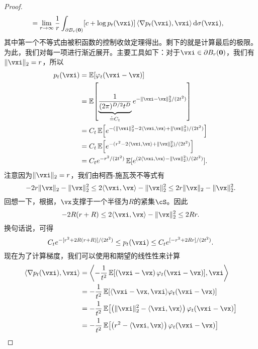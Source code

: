 \documentclass[../../book-main_zh.tex]{subfiles}
\begin{document}
\begin{proof}
\begin{align}
        &= \lim_{r \to \infty}\frac{1}{r}\int_{\partial B_{r}(\vzero)}[c + \log p_{t}(\vxi)]\ip*{\nabla p_{t}(\vxi)}{\vxi}\odif{\sigma(\vxi)},
    \end{align}
    其中第一个不等式由被积函数的控制收敛定理得出。剩下的就是计算最后的极限。为此，我们对每一项进行渐近展开。主要工具如下：对于\(\vxi \in \partial B_{r}(\vzero)\)，我们有\(\norm{\vxi}_{2} = r\)，所以
    \begin{align}
        p_{t}(\vxi)
        &= \Ex[\phi_{t}(\vxi - \vx)] \\ 
        &= \Ex\rs{\underbrace{\frac{1}{(2\pi)^{D/2}t^{D}}}_{\doteq C_{t}}e^{-\|\vxi - \vx\|_{2}^{2}/(2t^{2})}} \\
        &= C_{t}\Ex\rs{e^{-(\norm{\vxi}_{2}^{2} - 2\ip{\vxi}{\vx} + \norm{\vx}_{2}^{2})/(2t^{2})}} \\ 
        &= C_{t}\Ex\rs{e^{-(r^{2} - 2\ip{\vxi}{\vx} + \norm{\vx}_{2}^{2})/(2t^{2})}} \\ 
        &= C_{t}e^{-r^{2}/(2t^{2})}\Ex[e^{(2\ip{\vxi}{\vx} - \norm{\vx}_{2}^{2})/(2t^{2})}]. 
    \end{align}
    注意因为\(\norm{\vxi}_{2} = r\)，我们由柯西-施瓦茨不等式有
    \begin{equation}
        -2r\norm{\vx}_{2} - \norm{\vx}_{2}^{2} \leq 2\ip{\vxi}{\vx} - \norm{\vx}_{2}^{2} \leq 2r\norm{\vx}_{2} - \norm{\vx}_{2}^{2}.
    \end{equation}
    回想一下，根据，\(\vx\)支撑于一个半径为\(R\)的紧集\(\cS\)。因此
    \begin{equation}
        -2R(r + R) \leq 2\ip{\vxi}{\vx} - \norm{\vx}_{2}^{2} \leq 2Rr.
    \end{equation}
    换句话说，可得
    \begin{equation}
        C_{t}e^{-[r^{2} + 2R(r + R)]/(2t^{2})} \leq p_{t}(\vxi) \leq C_{t}e^{[-r^{2} + 2Rr]/(2t^{2})}.
    \end{equation}
    现在为了计算梯度，我们可以使用和期望的线性性来计算
    \begin{align}
        \ip{\nabla p_{t}(\vxi)}{\vxi}
        &= \ip*{-\frac{1}{t^{2}}\Ex\rs{\bp{\vxi - \vx}\phi_{t}(\vxi - \vx)}}{\vxi} \\
        &= -\frac{1}{t^{2}}\Ex\rs{\ip{\vxi - \vx}{\vxi}\phi_{t}(\vxi - \vx)} \\
        &= -\frac{1}{t^{2}}\Ex\rs{\bp{\norm{\vxi}_{2}^{2} - \ip{\vxi}{\vx}}\phi_{t}(\vxi - \vx)} \\
        &= -\frac{1}{t^{2}}\Ex\rs{\bp{r^{2} - \ip{\vxi}{\vx}}\phi_{t}(\vxi - \vx)} \\

\end{align}
\end{proof}
\end{document}
